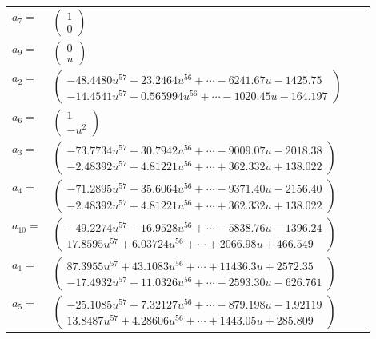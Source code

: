 \documentclass[1p]{elsarticle_modified}
\theoremstyle{definition}
\begin{document}
\begin{tabular}{m{7pt} m{180pt} m{7pt} m{180pt} }
\flushright $a_{7}=$&$\begin{pmatrix}1\\0\end{pmatrix}$ \\
\flushright $a_{9}=$&$\begin{pmatrix}0\\u\end{pmatrix}$ \\
\flushright $a_{2}=$&$\begin{pmatrix}-48.4480 u^{57}-23.2464 u^{56}+\cdots-6241.67 u-1425.75\\-14.4541 u^{57}+0.565994 u^{56}+\cdots-1020.45 u-164.197\end{pmatrix}$ \\
\flushright $a_{6}=$&$\begin{pmatrix}1\\- u^2\end{pmatrix}$ \\
\flushright $a_{3}=$&$\begin{pmatrix}-73.7734 u^{57}-30.7942 u^{56}+\cdots-9009.07 u-2018.38\\-2.48392 u^{57}+4.81221 u^{56}+\cdots+362.332 u+138.022\end{pmatrix}$ \\
\flushright $a_{4}=$&$\begin{pmatrix}-71.2895 u^{57}-35.6064 u^{56}+\cdots-9371.40 u-2156.40\\-2.48392 u^{57}+4.81221 u^{56}+\cdots+362.332 u+138.022\end{pmatrix}$ \\
\flushright $a_{10}=$&$\begin{pmatrix}-49.2274 u^{57}-16.9528 u^{56}+\cdots-5838.76 u-1396.24\\17.8595 u^{57}+6.03724 u^{56}+\cdots+2066.98 u+466.549\end{pmatrix}$ \\
\flushright $a_{1}=$&$\begin{pmatrix}87.3955 u^{57}+43.1083 u^{56}+\cdots+11436.3 u+2572.35\\-17.4932 u^{57}-11.0326 u^{56}+\cdots-2593.30 u-626.761\end{pmatrix}$ \\
\flushright $a_{5}=$&$\begin{pmatrix}-25.1085 u^{57}+7.32127 u^{56}+\cdots-879.198 u-1.92119\\13.8487 u^{57}+4.28606 u^{56}+\cdots+1443.05 u+285.809\end{pmatrix}$ \\

\end{tabular}
\end{document}
